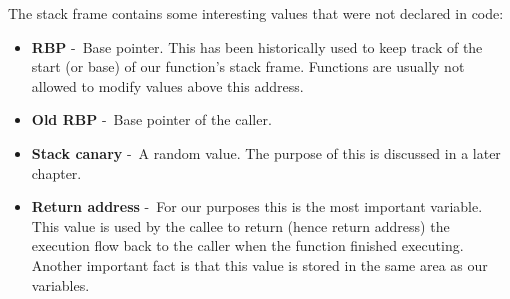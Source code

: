 \documentclass{article}
\begin{document}
The stack frame contains some interesting values that were not declared in code:
\begin{itemize}
  \item \textbf{RBP} -~Base pointer. This has been historically used to keep
        track of the start (or base) of our function's stack frame. Functions are usually not allowed to modify values above this address.
  \item \textbf{Old RBP} -~Base pointer of the caller.
  \item \textbf{Stack canary} -~A random value. The purpose of this is discussed in a later chapter.
  \item \textbf{Return address} -~For our purposes this is the most important variable. This value is used by the callee to return (hence return address) the execution flow back to the caller when the function finished executing. Another important fact is that this value is stored in the same area as our variables.
\end{itemize}
\end{document}
